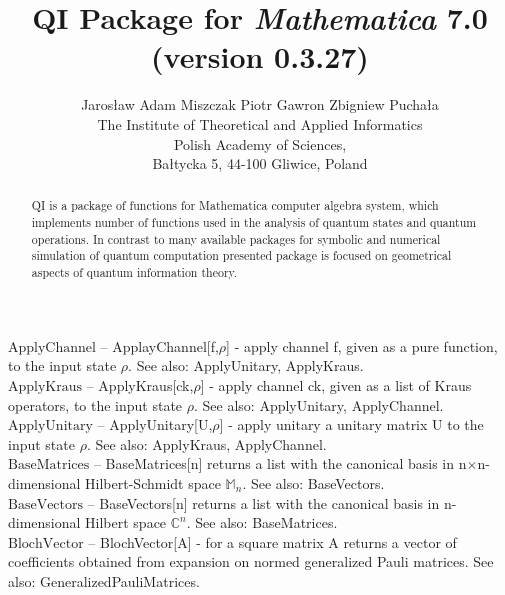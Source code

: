 \documentclass[a4paper,10pt]{scrartcl}
\begin{document}
	\title{QI Package for \emph{Mathematica} 7.0 \\(version 0.3.27)}\author{Jaros{\l}aw Adam Miszczak \quad Piotr Gawron \quad Zbigniew Pucha{\l}a\\
	{The Institute of Theoretical and Applied Informatics}\\
	{Polish Academy of Sciences},\\
	{Ba{\l}tycka 5, 44-100 Gliwice, Poland}}
	\maketitle
	\begin{abstract}QI is a package of functions for Mathematica computer algebra system, which implements 
number of functions used in the analysis of quantum states and quantum operations. In contrast to 
many available packages for symbolic and numerical simulation of quantum computation presented 
package is focused on geometrical aspects of quantum information theory.\end{abstract}
	\textbf{$ \text{ApplyChannel} $ }-- ApplayChannel[f,$\rho $] - apply channel f, given as a pure function, to the input state $\rho $. See also: ApplyUnitary, ApplyKraus.$  $\\

\textbf{$ \text{ApplyKraus} $ }-- ApplyKraus[ck,$\rho $] - apply channel ck, given as a list of Kraus operators, to the input state $\rho $. See also: ApplyUnitary, ApplyChannel.$  $\\

\textbf{$ \text{ApplyUnitary} $ }-- ApplyUnitary[U,$\rho $] - apply unitary a unitary matrix U to the input state $\rho $. See also: ApplyKraus, ApplyChannel.$  $\\

\textbf{$ \text{BaseMatrices} $ }-- BaseMatrices[n] returns a list with the canonical basis in n$\times $n-dimensional Hilbert-Schmidt space $ \mathbb{M}_n $. See also: BaseVectors.$  $\\

\textbf{$ \text{BaseVectors} $ }-- BaseVectors[n] returns a list with the canonical basis in n-dimensional Hilbert space $ \mathbb{C}^n $. See also: BaseMatrices.$  $\\

\textbf{$ \text{BlochVector} $ }-- BlochVector[A] - for a square matrix A returns a vector of coefficients obtained from expansion on normed generalized Pauli matrices. See also: GeneralizedPauliMatrices.$  $\\
\end{document}
